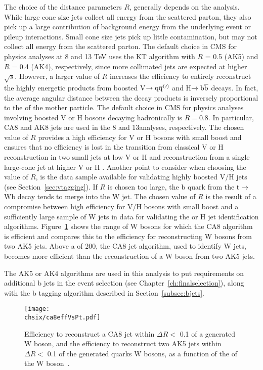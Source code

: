 The choice of the distance parameters $R$, generally depends on the analysis. While large cone size jets collect all energy from the scattered parton, they also pick up a large contribution of background energy from the underlying event or pileup interactions. Small cone size jets pick up little contamination, but may not collect all energy from the scattered parton. 
The default choice in CMS for physics analyses at 8 and 13 TeV uses the KT algorithm with $R$ = 0.5 (AK5) and $R$ = 0.4 (AK4), respectively, since more collimated jets are expected at higher $\sqrt{s}$.
However, a larger value of $R$ increases the efficiency to entirely reconstruct the highly energetic products from boosted V$\rightarrow\mathrm{q}\overline{\mathrm{q}}^({}'^){}$ and H$\rightarrow{\mathrm{b}\overline{\mathrm{b}}}$ decays. In fact, the average angular distance between the decay products is inversely proportional to the \pt of the mother particle. The default choice in CMS for physics analyses involving boosted V or H bosons decaying hadronically is $R = 0.8$. In particular, CA8 and AK8 jets are used in the 8 and 13\TeV analyses, respectively. The chosen value of $R$ provides a high efficiency for V or H bosons with small boost and ensures that no efficiency is lost in the transition from classical V or H reconstruction in two small jets at low V or H \pt and reconstruction from a single large-cone jet at higher V or H \pt. Another point to consider when choosing the value of $R$, is the \ttbar data sample available for validating highly boosted V/H jets (see Section~\ref{sec:vtagging}). If $R$ is chosen too large, the b quark from the t$\rightarrow$Wb decay tends to merge into the W jet. The chosen value of $R$ is the result of a compromise between high efficiency for V/H bosons with small boost and a sufficiently large sample of W jets in \ttbar data for validating the  or H jet identification algorithms. Figure~\ref{fig:ca8effVsPt} shows the \pt range of W bosons for which the CA8 algorithm is efficient and compares this to the efficiency for reconstructing W bosons from two AK5 jets. Above a \pt of 200\GeV, the CA8 jet algorithm, used to identify W jets, becomes more efficient than the reconstruction of a W boson from two AK5 jets.

The AK5 or AK4 algorithms are used in this analysis to put requirements on additional b jets in the event selection (see Chapter~\ref{ch:finalselection}), along with the b tagging algorithm described in Section~\ref{subsec:bjets}.

\begin{figure}[!htb]
 \begin{center}
  \texttt{[image: \\chsix/ca8effVsPt.pdf]}
 \end{center}
 \caption{Efficiency to reconstruct a CA8 jet within $\Delta R <$ 0.1 of a generated W boson, and the efficiency to reconstruct two AK5 jets within $\Delta R <$ 0.1 of the generated quarks W bosons, as a function of the \pt of the W boson~\cite{Khachatryan:2014vla}.}
 \label{fig:ca8effVsPt}
\end{figure}

